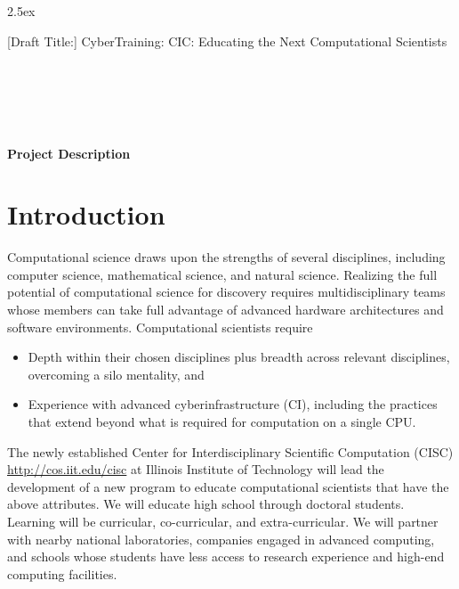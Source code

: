 \documentclass[11pt]{NSFamsart}
\begin{document}
\leftmargini2.5ex %

[Draft Title:]  	CyberTraining: CIC:  Educating the Next Computational Scientists

\noindent
{}\\
 \\
 \\
 \\

\bigskip


\bigskip

\centerline{\Large \textbf{Project Description}}
\vspace{-2ex}

\setcounter{tocdepth}{2}
\tableofcontents %

\vspace{-6ex}

\section{Introduction}
Computational science draws upon the strengths of several disciplines, including computer science, mathematical science, and natural science.  Realizing the full potential of computational science for discovery requires multidisciplinary teams whose members can take full advantage of advanced hardware architectures and software environments.  Computational scientists require

\begin{itemize}
\item Depth within their chosen disciplines plus breadth across relevant disciplines, overcoming a silo mentality, and
\item Experience with advanced cyberinfrastructure (CI), including the practices that extend beyond what is required for computation on a single CPU.
\end{itemize}

The newly established Center for Interdisciplinary Scientific Computation (CISC) \url{http://cos.iit.edu/cisc} at Illinois Institute of Technology will lead the development of a new program to educate computational scientists that have the above attributes.  We will educate high school through doctoral students.  Learning will be curricular, co-curricular, and extra-curricular.  We will partner with nearby national laboratories, companies engaged in advanced computing, and schools whose students have less access to research experience and high-end computing facilities.
\end{document}
